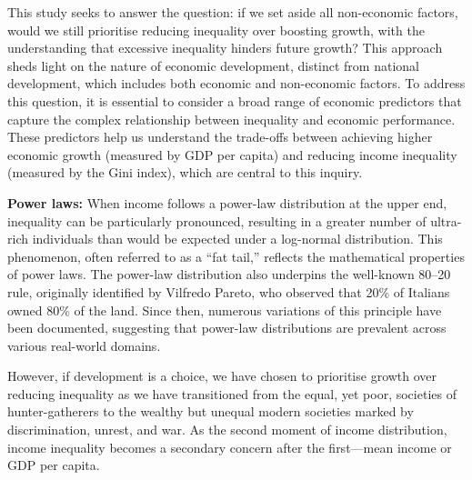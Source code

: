This study seeks to answer the question: if we set aside all non-economic factors, would we still prioritise reducing inequality over boosting growth, with the understanding that excessive inequality hinders future growth? This approach sheds light on the nature of economic development, distinct from national development, which includes both economic and non-economic factors. To address this question, it is essential to consider a broad range of economic predictors that capture the complex relationship between inequality and economic performance. These predictors help us understand the trade-offs between achieving higher economic growth (measured by GDP per capita) and reducing income inequality (measured by the Gini index), which are central to this inquiry.




\textbf{Power laws:} When income follows a power-law distribution at the upper end, inequality can be particularly pronounced, resulting in a greater number of ultra-rich individuals than would be expected under a log-normal distribution. This phenomenon, often referred to as a “fat tail,” reflects the mathematical properties of power laws. The power-law distribution also underpins the well-known 80–20 rule, originally identified by Vilfredo Pareto, who observed that 20\% of Italians owned 80\% of the land. Since then, numerous variations of this principle have been documented, suggesting that power-law distributions are prevalent across various real-world domains.






However, if development is a choice, we have chosen to prioritise growth over reducing inequality as we have transitioned from the equal, yet poor, societies of hunter-gatherers to the wealthy but unequal modern societies marked by discrimination, unrest, and war. As the second moment of income distribution, income inequality becomes a secondary concern after the first—mean income or GDP per capita. 